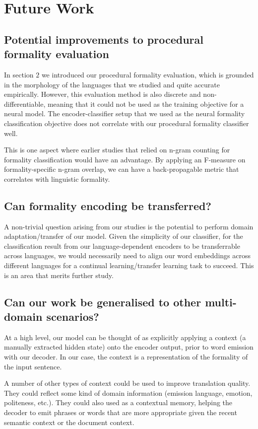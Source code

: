 \documentclass[11pt]{article}
\begin{document}
\section{Future Work}

\subsection{Potential improvements to procedural formality evaluation}

In section $2$ we introduced our procedural formality evaluation, which is grounded in the morphology of the languages that we studied and quite accurate empirically. However, this evaluation method is also discrete and non-differentiable, meaning that it could not be used as the training objective for a neural model. The encoder-classifier setup that we used as the neural formality classification objective does not correlate with our procedural formality classifier well. 

This is one aspect where earlier studies that relied on n-gram counting for formality classification would have an advantage. By applying an F-measure on formality-specific n-gram overlap, we can have a back-propagable metric that correlates with linguistic formality.

\subsection{Can formality encoding be transferred?}

A non-trivial question arising from our studies is the potential to perform domain adaptation/transfer of our model. Given the simplicity of our classifier, for the classification result from our language-dependent encoders to be transferrable across languages, we would necessarily need to align our word embeddings across different languages for a continual learning/transfer learning task to succeed. This is an area that merits further study.

\subsection{Can our work be generalised to other multi-domain scenarios?}

At a high level, our model can be thought of as explicitly applying a context (a manually extracted hidden state) onto the encoder output, prior to word emission with our decoder. In our case, the context is a representation of the formality of the input sentence.

A number of other types of context could be used to improve translation quality. They could reflect some kind of domain information (emission language, emotion, politeness, etc.). They could also used as a contextual memory, helping the decoder to emit phrases or words that are more appropriate given the recent semantic context or the document context.

\newpage
\printbibliography
\end{document}
